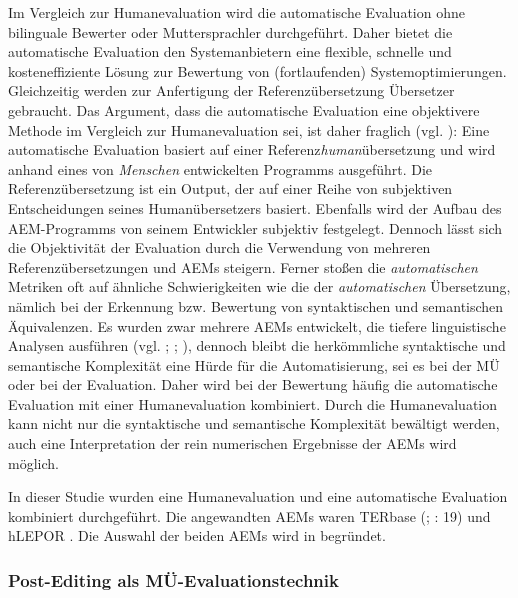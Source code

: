 Im Vergleich zur Humanevaluation wird die automatische Evaluation ohne bilinguale Bewerter oder Muttersprachler durchgeführt. Daher bietet die automatische Evaluation den Systemanbietern eine flexible, schnelle und kosteneffiziente Lösung zur Bewertung von (fortlaufenden) Systemoptimierungen. Gleichzeitig werden zur Anfertigung der Referenzübersetzung Übersetzer gebraucht. Das Argument, dass die automatische Evaluation eine objektivere Methode im Vergleich zur Humanevaluation sei, ist daher fraglich (vgl. \citealt{Doherty2017}): Eine automatische Evaluation basiert auf einer Referenz\textit{human}übersetzung und wird anhand eines von \textit{Menschen} entwickelten Programms ausgeführt. Die Referenzübersetzung ist ein Output, der auf einer Reihe von subjektiven Entscheidungen seines Humanübersetzers basiert. Ebenfalls wird der Aufbau des AEM-Programms von seinem Entwickler subjektiv festgelegt. Dennoch lässt sich die Objektivität der Evaluation durch die Verwendung von mehreren Referenzübersetzungen und AEMs steigern. Ferner stoßen die \textit{automatischen} Metriken oft auf ähnliche Schwierigkeiten wie die der \textit{automatischen} Übersetzung, nämlich bei der Erkennung bzw. Bewertung von syntaktischen und semantischen Äquivalenzen. Es wurden zwar mehrere AEMs entwickelt, die tiefere linguistische Analysen ausführen (vgl. \citealt{GiménezMàrquez2008}; \citealt{PadóEtAl2009}; \citealt{LiuEtAl2011}), dennoch bleibt die herkömmliche syntaktische und semantische Komplexität eine Hürde für die Automatisierung, sei es bei der MÜ oder bei der Evaluation. Daher wird bei der Bewertung häufig die automatische Evaluation mit einer Humanevaluation kombiniert. Durch die Humanevaluation kann nicht nur die syntaktische und semantische Komplexität bewältigt werden, auch eine Interpretation der rein numerischen Ergebnisse der AEMs wird möglich.

In dieser Studie wurden eine Humanevaluation und eine automatische Evaluation kombiniert durchgeführt. Die angewandten AEMs waren TERbase (\citealt{SnoverEtAl2006}; \citealt{GonzàlezGiménez2014}: 19) und hLEPOR \citep{HanEtAl2013}. Die Auswahl der beiden AEMs wird in  begründet.

\subsubsection{\label{sec:3.3.3.3} Post-Editing als MÜ-Evaluationstechnik}


